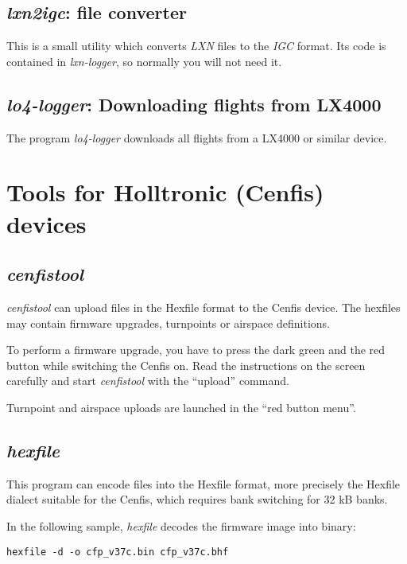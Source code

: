 \documentclass{article}
\begin{document}
\subsection{{\em lxn2igc}: file converter}

This is a small utility which converts {\em LXN} files to the {\em
IGC} format.  Its code is contained in {\em lxn-logger}, so normally
you will not need it.

\subsection{{\em lo4-logger}: Downloading flights from LX4000}

The program {\em lo4-logger} downloads all flights from a LX4000 or
similar device.


\section{Tools for Holltronic (Cenfis) devices}

\subsection{{\em cenfistool}}

{\em cenfistool} can upload files in the Hexfile format to the Cenfis
device.  The hexfiles may contain firmware upgrades, turnpoints or
airspace definitions.

To perform a firmware upgrade, you have to press the dark green and
the red button while switching the Cenfis on.  Read the instructions
on the screen carefully and start {\em cenfistool} with the ``upload''
command.

Turnpoint and airspace uploads are launched in the ``red button
menu''.

\subsection{{\em hexfile}}

This program can encode files into the Hexfile format, more precisely
the Hexfile dialect suitable for the Cenfis, which requires bank
switching for 32 kB banks.

In the following sample, {\em hexfile} decodes the firmware image into
binary:

\begin{verbatim}
hexfile -d -o cfp_v37c.bin cfp_v37c.bhf
\end{verbatim}
\end{document}
